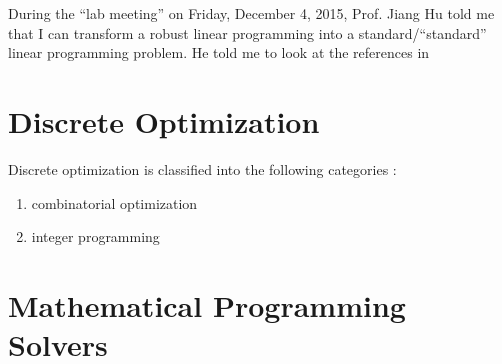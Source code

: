 During the ``lab meeting'' on Friday, December 4, 2015, Prof. Jiang Hu told me that I can transform a robust linear programming into a standard/``standard'' linear programming problem. He told me to look at the references in 




\section{Discrete Optimization}
\label{sec:DiscreteOptimization}

Discrete optimization is classified into the following categories \cite{WikipediaContributors2015h,Hammer1979,Lee2004c}: \vspace{-0.3cm}
\begin{enumerate} \itemsep -4pt
\item combinatorial optimization
\item integer programming
\end{enumerate}








\section{Mathematical Programming Solvers}
\label{sec:MathematicalProgrammingSolvers}

